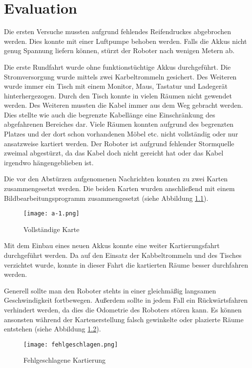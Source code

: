 \chapter{Evaluation} %
\label{cha:evaluation}

Die ersten Versuche mussten aufgrund fehlendes Reifendruckes abgebrochen werden. Dies konnte mit einer Luftpumpe behoben werden. Falls die Akkus nicht genug Spannung liefern können, stürzt der Roboter nach wenigen Metern ab.\par
Die erste Rundfahrt wurde ohne funktionstüchtige Akkus durchgeführt. Die Stromversorgung wurde mittels zwei Karbeltrommeln gesichert. Des Weiteren wurde immer ein Tisch mit einem Monitor, Maus, Tastatur und Ladegerät hinterhergezogen. Durch den Tisch konnte in vielen Räumen nicht gewendet werden. Des Weiteren mussten die Kabel immer aus dem Weg gebracht werden. Dies stellte wie auch die begrenzte Kabellänge eine Einschränkung des abgefahrenen Bereiches dar. Viele Räumen konnten aufgrund des begrenzten Platzes und der dort schon vorhandenen Möbel etc. nicht vollständig oder nur ansatzweise kartiert werden. Der Roboter ist aufgrund fehlender Stormquelle zweimal abgestürzt, da das Kabel doch nicht gereicht hat oder das Kabel irgendwo hängengeblieben ist.\par
Die vor den Abstürzen aufgenomenen Nachrichten konnten zu zwei Karten zusammengesetzt werden. Die beiden Karten wurden anschließend mit einem Bildbearbeitungsprogramm zusammengesetzt (siehe Abbildung \ref{fig:vollstaendige-karte}).\par

\begin{figure}[!htb]
	\centering
	\texttt{[image: a-1.png]}
	\caption{Vollständige Karte}
	\label{fig:vollstaendige-karte}
\end{figure}

Mit dem Einbau eines neuen Akkus konnte eine weiter Kartierungsfahrt durchgeführt werden. Da auf den Einsatz der Kabbeltrommeln und des Tisches verzichtet wurde, konnte in dieser Fahrt die kartierten Räume besser durchfahren werden.\par
Generell sollte man den Roboter stehts in einer gleichmäßig langsamen Geschwindigkeit fortbewegen. Außerdem sollte in jedem Fall ein Rückwärtsfahren verhindert werden, da dies die Odometrie des Roboters stören kann. Es können ansonsten während der Kartenerstellung falsch gewinkelte oder plazierte Räume entstehen (siehe Abbildung \ref{fig:fehlgeschlagen}).

\begin{figure}[!htb]
	\centering
	\texttt{[image: fehlgeschlagen.png]}
	\caption{Fehlgeschlagene Kartierung}
	\label{fig:fehlgeschlagen}
\end{figure}

